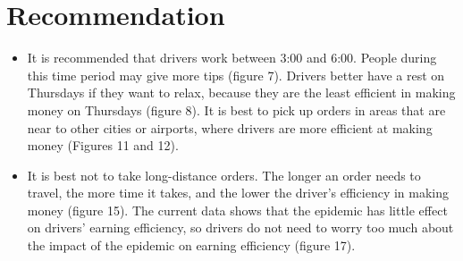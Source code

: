 \documentclass[11pt]{article}
\begin{document}
\section{Recommendation}
\begin{itemize}
    \item It is recommended that drivers work between 3:00 and 6:00. People during this time period may give more tips (figure 7). Drivers better have a rest on Thursdays if they want to relax,  because they are the least efficient in making money on Thursdays (figure 8). It is best to pick up orders in areas that are near to other cities or airports, where drivers are more efficient at making money (Figures 11 and 12).
\end{itemize}
\begin{itemize}
    \item It is best not to take long-distance orders. The longer an order needs to travel, the more time it takes, and the lower the driver's efficiency in making money (figure 15). The current data shows that the epidemic has little effect on drivers’ earning efficiency, so drivers do not need to worry too much about the impact of the epidemic on earning efficiency (figure 17).
\end{itemize}
\vfill
\newpage
\printbibliography
\end{document}
